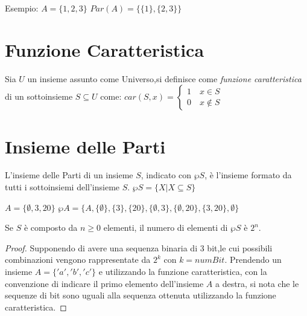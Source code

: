 Esempio:
$A = \{ 1,2,3 \}$ \newline
$Par(A) = \{ \{ 1 \},\{2,3 \} \}$

\section{Funzione Caratteristica}
Sia $U$ un insieme assunto come Universo,si definisce come \emph{funzione caratteristica}
di un sottoinsieme $S \subseteq U$ come:
$car(S,x) = \begin{cases} 1 \quad x \in S \\ 0 \quad x \not \in S \end{cases}$

\section{Insieme delle Parti}
L'insieme delle Parti di un insieme $S$, indicato con $\wp S$, è l'insieme formato
da tutti i sottoinsiemi dell'insieme $S$. \newline
$\wp S = \{X | X \subseteq S\} $

$A = \{\emptyset,3,20 \}$
$\wp A = \{A,\{\emptyset\},\{ 3\},\{ 20 \},\{ \emptyset,3 \},\{\emptyset,20 \},\{3,20\},\emptyset \}$

\begin{defi}
Se $S$ è composto da $n \geq 0$ elementi, il numero di elementi di $\wp S$ è $2 ^ n$.
\end{defi}
\begin{proof}
Supponendo di avere una sequenza binaria di 3 bit,le cui possibili combinazioni
vengono rappresentate da $2 ^ k$ con $k = numBit$.\newline
Prendendo un insieme $A = \{'a','b','c' \}$ e utilizzando la funzione caratteristica,
con la convenzione di indicare il primo elemento dell'insieme $A$ a destra, si nota
che le sequenze di bit sono uguali alla sequenza ottenuta utilizzando la funzione caratteristica.
\end{proof}


